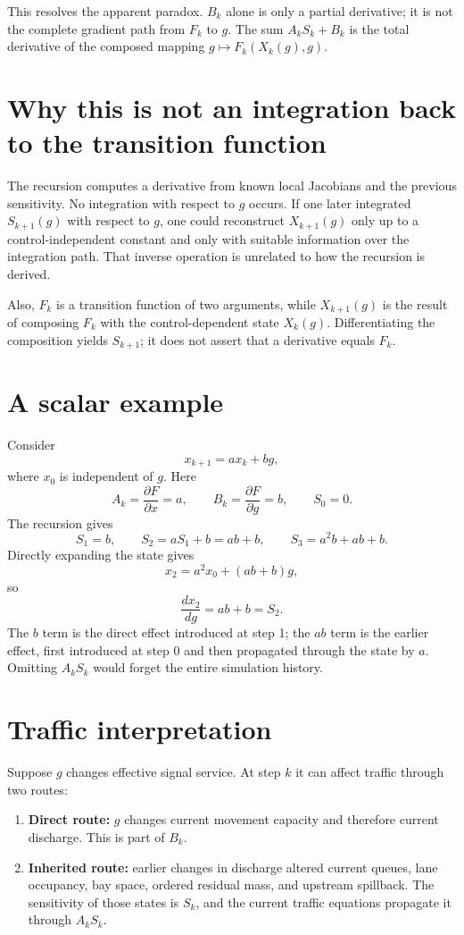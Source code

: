 \documentclass[10pt]{article}
\begin{document}
This resolves the apparent paradox. $B_k$ alone is only a partial derivative; it is not the complete gradient path from $F_k$ to $g$. The sum $A_kS_k+B_k$ is the total derivative of the composed mapping $g\mapsto F_k(X_k(g),g)$.

\section{Why this is not an integration back to the transition function}
The recursion computes a derivative from known local Jacobians and the previous sensitivity. No integration with respect to $g$ occurs. If one later integrated $S_{k+1}(g)$ with respect to $g$, one could reconstruct $X_{k+1}(g)$ only up to a control-independent constant and only with suitable information over the integration path. That inverse operation is unrelated to how the recursion is derived.

Also, $F_k$ is a transition function of two arguments, while $X_{k+1}(g)$ is the result of composing $F_k$ with the control-dependent state $X_k(g)$. Differentiating the composition yields $S_{k+1}$; it does not assert that a derivative equals $F_k$.

\section{A scalar example}
Consider
\[
  x_{k+1}=a x_k+b g,
\]
where $x_0$ is independent of $g$. Here
\[
  A_k=\frac{\partial F}{\partial x}=a,
  \qquad
  B_k=\frac{\partial F}{\partial g}=b,
  \qquad
  S_0=0.
\]
The recursion gives
\[
  S_1=b,
  \qquad
  S_2=aS_1+b=ab+b,
  \qquad
  S_3=a^2b+ab+b.
\]
Directly expanding the state gives
\[
  x_2=a^2x_0+(ab+b)g,
\]
so
\[
  \frac{dx_2}{dg}=ab+b=S_2.
\]
The $b$ term is the direct effect introduced at step 1; the $ab$ term is the earlier effect, first introduced at step 0 and then propagated through the state by $a$. Omitting $A_kS_k$ would forget the entire simulation history.

\section{Traffic interpretation}
Suppose $g$ changes effective signal service. At step $k$ it can affect traffic through two routes:

\begin{enumerate}
\item \textbf{Direct route:} $g$ changes current movement capacity and therefore current discharge. This is part of $B_k$.
\item \textbf{Inherited route:} earlier changes in discharge altered current queues, lane occupancy, bay space, ordered residual mass, and upstream spillback. The sensitivity of those states is $S_k$, and the current traffic equations propagate it through $A_kS_k$.
\end{enumerate}
\end{document}
